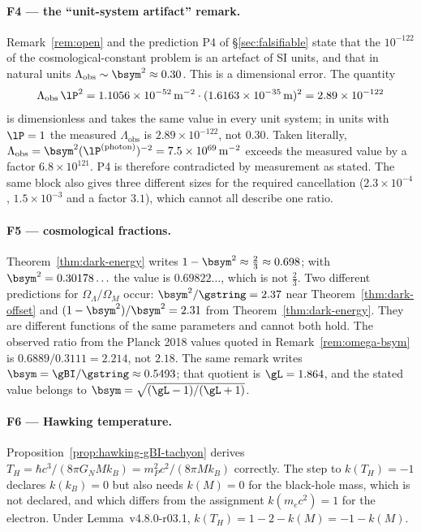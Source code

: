 \paragraph{F4 --- the ``unit-system artifact'' remark.}
Remark~\ref{rem:open} and the prediction P4 of \S\ref{sec:falsifiable} state that the
\(10^{-122}\) of the cosmological-constant problem is an artefact of SI units, and that in
natural units \(\Lambda_{\mathrm{obs}}\sim\bsym^2\approx0.30\).  This is a dimensional error.
The quantity
\[
\Lambda_{\mathrm{obs}}\,\lP^{2}=1.1056\times10^{-52}\,\mathrm{m}^{-2}\cdot(1.6163\times10^{-35}\,\mathrm{m})^{2}
=2.89\times10^{-122}
\]
is dimensionless and takes the same value in every unit system; in units with \(\lP=1\) the
measured \(\Lambda_{\mathrm{obs}}\) is \(2.89\times10^{-122}\), not \(0.30\).  Taken literally,
\(\Lambda_{\mathrm{obs}}=\bsym^2(\lP^{(\mathrm{photon})})^{-2}=7.5\times10^{69}\,\mathrm{m}^{-2}\)
exceeds the measured value by a factor \(6.8\times10^{121}\).  P4 is therefore contradicted by
measurement as stated.  The same block also gives three different sizes for the required
cancellation (\(2.3\times10^{-4}\), \(1.5\times10^{-3}\) and a factor \(3.1\)), which cannot all
describe one ratio.

\paragraph{F5 --- cosmological fractions.}
Theorem~\ref{thm:dark-energy} writes \(1-\bsym^2\approx\tfrac23\approx0.698\); with
\(\bsym^2=0.30178\ldots\) the value is \(0.69822\ldots\), which is not \(\tfrac23\).  Two different
predictions for \(\Omega_\Lambda/\Omega_M\) occur: \(\bsym^2/\gstring=2.37\) near
Theorem~\ref{thm:dark-offset} and \((1-\bsym^2)/\bsym^2=2.31\) from
Theorem~\ref{thm:dark-energy}.  They are different functions of the same parameters and cannot
both hold.  The observed ratio from the Planck 2018 values quoted in
Remark~\ref{rem:omega-bsym} is \(0.6889/0.3111=2.214\), not \(2.18\).  The same remark writes
\(\bsym=\gBI/\gstring\approx0.5493\); that quotient is \(\gL=1.864\), and the stated value
belongs to \(\bsym=\sqrt{(\gL-1)/(\gL+1)}\).

\paragraph{F6 --- Hawking temperature.}
Proposition~\ref{prop:hawking-gBI-tachyon} derives
\(T_H=\hbar c^3/(8\pi G_NMk_B)=m_P^2c^2/(8\pi Mk_B)\) correctly.  The step to
\(k(T_H)=-1\) declares \(k(k_B)=0\) but also needs \(k(M)=0\) for the black-hole mass, which is
not declared, and which differs from the assignment \(k(m_ec^2)=1\) for the electron.  Under
Lemma~v4.8.0-r03.1, \(k(T_H)=1-2-k(M)=-1-k(M)\).

